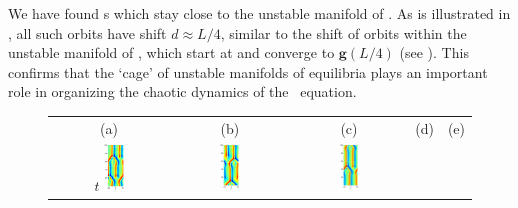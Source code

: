 We have found  \rpo s which stay
 close to the unstable
manifold of .
As is illustrated in , all such orbits have
shift $d \approx L/4$, similar to the shift of orbits within the
unstable manifold of , which start at  and converge
to $\mathbf{g}(L/4)$ (see ).
This confirms that the `cage' of unstable manifolds of equilibria
plays an important role in organizing the chaotic dynamics of
the \KS\ equation.

\begin{figure}[t]
\begin{center}
\begin{tabular}{ccccc} (a) & (b) & (c) & (d) & (e)\\
$t$
\includegraphics[width=0.18\textwidth]{figs/ks22rpo047.6-05.68.eps}\hspace{-3ex} &
\includegraphics[width=0.18\textwidth]{figs/ks22rpo055.6-05.25.eps}\hspace{-3ex} &
\includegraphics[width=0.18\textwidth]{figs/ks22rpo059.9-05.44.eps}\hspace{-3ex} &

\end{tabular}
\end{center}
\end{figure}
